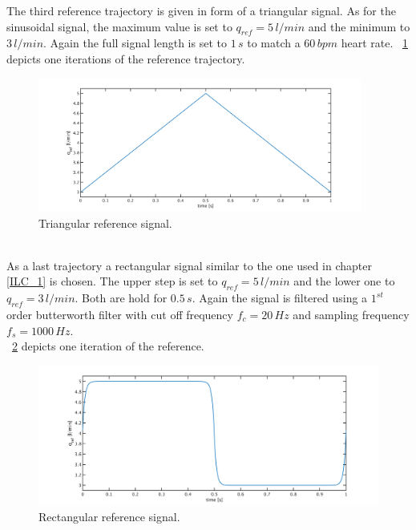 The third reference trajectory is given in form of a triangular signal. As for the sinusoidal signal, the maximum value is set to $q_{ref}=5\,l/min$ and the minimum to $3\, l/min$. Again the full signal length is set to $1\,s$ to match a $60\,bpm$ heart rate. \figurename~\ref{fig:ref_triang} depicts one iterations of the reference trajectory.
\begin{figure}[ht]
  \centering
  \includegraphics[width=0.95\textwidth]{images/chapt_5/ILC/ref_triang.pdf}
  \caption[Triangular reference signal]{Triangular reference signal.}
  \label{fig:ref_triang}
\end{figure}
\\As a last trajectory a rectangular signal similar to the one used in chapter \ref{ILC_1} is chosen. The upper step is set to $q_{ref}=5\,l/min$ and the lower one to $q_{ref}=3\,l/min$. Both are hold for $0.5\,s$. Again the signal is filtered using a $1^{st}$ order butterworth filter with cut off frequency $f_c=20\,Hz$ and sampling frequency $f_s=1000\,Hz$.
\\\figurename~\ref{fig:ref_square} depicts one iteration of the reference.
\begin{figure}[ht]
  \centering
  \includegraphics[width=\textwidth]{images/chapt_5/ILC/ref_square.pdf}
  \caption[Rectangular reference signal]{Rectangular reference signal.}
  \label{fig:ref_square}
\end{figure}
%


